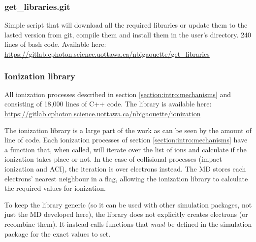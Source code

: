 \subsubsection{get\_libraries.git} \label{section:tools:libraries:getlibraries}

Simple script that will download all the required libraries or
update them to the lasted version from git, compile them and install them in the
user's directory. 240 lines of bash code.
Available here:\\
\url{https://gitlab.cphoton.science.uottawa.ca/nbigaouette/get_libraries}



\subsubsection{Ionization library}
\label{section:tools:libraries:ionization}

All ionization processes described in section
\ref{section:intro:mechanisms} and consisting of 18,000 lines of C++ code.
The library is available here:\\
\url{https://gitlab.cphoton.science.uottawa.ca/nbigaouette/ionization}

The ionization library is a large part of the work as can be seen by the amount
of line of code. Each ionization processes of section
\ref{section:intro:mechanisms} have a function that, when called, will iterate
over the list of ions and calculate if the ionization takes place or not. In the
case of collisional processes (impact ionization and ACI), the iteration is over
electrons instead. The MD stores each electrons' nearest neighbour in a flag,
allowing the ionization library to calculate the required values for ionization.

To keep the library generic (so it can be used with other simulation packages,
not just the MD developed here), the library does not explicitly creates
electrons (or recombine them). It instead calls functions that \textit{must}
be defined in the simulation package for the exact values to set.


